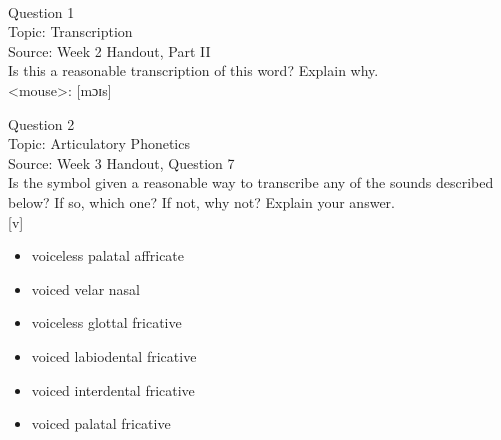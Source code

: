 \documentclass[12pt]{article}
\begin{document}
\newpage

\begin{center}
\textbf{{\color{red}{\HUGE END OF EXAM}}}\\

\end{center}
\newpage

\begin{center}
\textbf{{\color{blue}{\HUGE START OF EXAM\\}}}

\textbf{{\color{blue}{\HUGE Student ID: 60523\\}}}

\textbf{{\color{blue}{\HUGE \\}}}

\end{center}
\newpage

{\large Question 1}\\

Topic: Transcription\\
Source: Week 2 Handout, Part II\\

Is this a reasonable transcription of this word? Explain why.\\

<mouse>: {[mɔɪs]}


\newpage

{\large Question 2}\\

Topic: Articulatory Phonetics\\
Source: Week 3 Handout, Question 7\\

Is the symbol given a reasonable way to transcribe any of the sounds described below? If so, which one? If not, why not? Explain your answer.\\

{[v]}

\begin{itemize} \item voiceless palatal affricate \item voiced velar nasal \item voiceless glottal fricative \item voiced labiodental fricative \item voiced interdental fricative \item voiced palatal fricative \end{itemize}


\newpage
\end{document}
